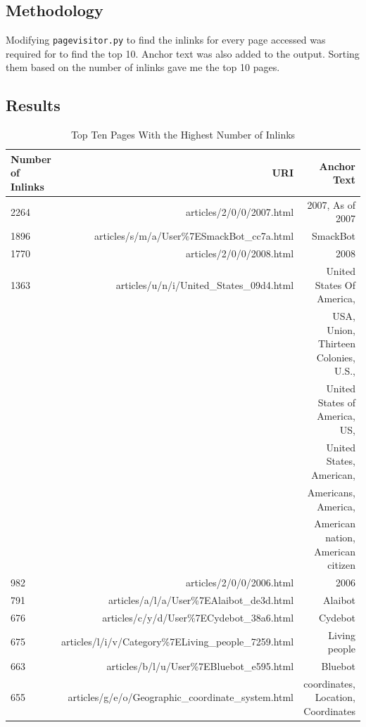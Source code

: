 \documentclass[10pt,letterpaper,bibliography=totoc]{scrartcl}
\begin{document}
\subsection{Methodology}
Modifying \texttt{pagevisitor.py} to find the inlinks for every page accessed was required for to find the top 10. Anchor text was also added to the output. Sorting them based on the number of inlinks gave me the top 10 pages. 

\subsection{Results}

\begin{table}
\begin{center}
  \begin{tabular}{ | l | r | r | }
    \hline
    Number of Inlinks & URI & Anchor Text \\
    \hline
    2264 & articles/2/0/0/2007.html & 2007, As of 2007 \\
    1896 & articles/s/m/a/User\%7ESmackBot\_cc7a.html & SmackBot \\
    1770 & articles/2/0/0/2008.html & 2008 \\
    1363 & articles/u/n/i/United\_States\_09d4.html & United States Of America, \\
     & & USA, Union, Thirteen Colonies, U.S., \\
     & & United States of America, US, \\
     & & United States, American, \\
     & & Americans, America, \\
     & & American nation, American citizen \\
    982 & articles/2/0/0/2006.html & 2006 \\
    791 & articles/a/l/a/User\%7EAlaibot\_de3d.html & Alaibot \\
    676 & articles/c/y/d/User\%7ECydebot\_38a6.html & Cydebot \\
    675 & articles/l/i/v/Category\%7ELiving\_people\_7259.html & Living people \\
    663 & articles/b/l/u/User\%7EBluebot\_e595.html & Bluebot \\
    655 & articles/g/e/o/Geographic\_coordinate\_system.html & coordinates, Location, Coordinates \\
    \hline
  \end{tabular}
\caption{Top Ten Pages With the Highest Number of Inlinks}
\label{table:inlinks}
\end{center}
\end{table}
\clearpage
\end{document}
